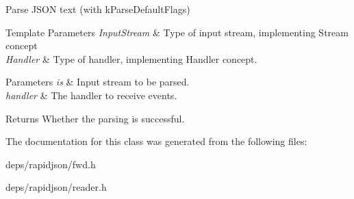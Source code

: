 Parse J\+S\+ON text (with k\+Parse\+Default\+Flags) 


\begin{DoxyTemplParams}{Template Parameters}
{\em Input\+Stream} & Type of input stream, implementing Stream concept \\
\hline
{\em Handler} & Type of handler, implementing Handler concept. \\
\hline
\end{DoxyTemplParams}

\begin{DoxyParams}{Parameters}
{\em is} & Input stream to be parsed. \\
\hline
{\em handler} & The handler to receive events. \\
\hline
\end{DoxyParams}
\begin{DoxyReturn}{Returns}
Whether the parsing is successful. 
\end{DoxyReturn}


The documentation for this class was generated from the following files\+:\begin{DoxyCompactItemize}
\item 
deps/rapidjson/fwd.\+h\item 
deps/rapidjson/reader.\+h\end{DoxyCompactItemize}
